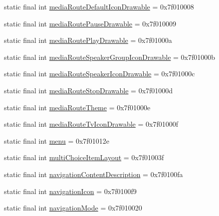 \begin{CompactItemize}
\item 
static final int \hyperlink{classandroid_1_1support_1_1v7_1_1appcompat_1_1_r_1_1attr_a2b018175d87f4caa50b92655a0d5202}{mediaRouteDefaultIconDrawable} = 0x7f010008
\item 
static final int \hyperlink{classandroid_1_1support_1_1v7_1_1appcompat_1_1_r_1_1attr_590a7a8fdf38d9c1391d0c5e686c24ac}{mediaRoutePauseDrawable} = 0x7f010009
\item 
static final int \hyperlink{classandroid_1_1support_1_1v7_1_1appcompat_1_1_r_1_1attr_980b7b80c3b5fee0d605c7ddb10171cb}{mediaRoutePlayDrawable} = 0x7f01000a
\item 
static final int \hyperlink{classandroid_1_1support_1_1v7_1_1appcompat_1_1_r_1_1attr_7dc76c7459b3caf5a6591678e7ee5a7c}{mediaRouteSpeakerGroupIconDrawable} = 0x7f01000b
\item 
static final int \hyperlink{classandroid_1_1support_1_1v7_1_1appcompat_1_1_r_1_1attr_1861497a9bef812eb9a46cdead921c7f}{mediaRouteSpeakerIconDrawable} = 0x7f01000c
\item 
static final int \hyperlink{classandroid_1_1support_1_1v7_1_1appcompat_1_1_r_1_1attr_fb225e4c1d67fc60598e4d0ac33489b6}{mediaRouteStopDrawable} = 0x7f01000d
\item 
static final int \hyperlink{classandroid_1_1support_1_1v7_1_1appcompat_1_1_r_1_1attr_ee03ba1905c5216a025b08f333e5906d}{mediaRouteTheme} = 0x7f01000e
\item 
static final int \hyperlink{classandroid_1_1support_1_1v7_1_1appcompat_1_1_r_1_1attr_c61edf7cefd87a49e2c7635bdd74029c}{mediaRouteTvIconDrawable} = 0x7f01000f
\item 
static final int \hyperlink{classandroid_1_1support_1_1v7_1_1appcompat_1_1_r_1_1attr_8d30d60b10606828651e8c499f4fbe4e}{menu} = 0x7f01012e
\item 
static final int \hyperlink{classandroid_1_1support_1_1v7_1_1appcompat_1_1_r_1_1attr_b3c13ecea5dbf95fc61058c63030d0b8}{multiChoiceItemLayout} = 0x7f01003f
\item 
static final int \hyperlink{classandroid_1_1support_1_1v7_1_1appcompat_1_1_r_1_1attr_44e9c28737d0a34e69caa628a752eef0}{navigationContentDescription} = 0x7f0100fa
\item 
static final int \hyperlink{classandroid_1_1support_1_1v7_1_1appcompat_1_1_r_1_1attr_502fb9e46161a601206d48128eada6d5}{navigationIcon} = 0x7f0100f9
\item 
static final int \hyperlink{classandroid_1_1support_1_1v7_1_1appcompat_1_1_r_1_1attr_a66aac0e39a018298c9630401244a39d}{navigationMode} = 0x7f010020

\end{CompactItemize}
